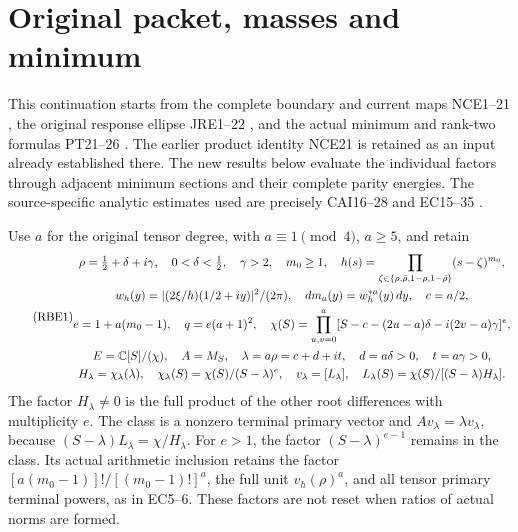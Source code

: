 \section{Original packet, masses and minimum}

This continuation starts from the complete boundary and current maps
NCE1--21 \cite{a04rbe:nce}, the original response ellipse JRE1--22
\cite{a04rbe:jre}, and the actual minimum and rank-two formulas PT21--26
\cite{a04rbe:pt}. The earlier product identity NCE21 is retained as an
input already established there. The new results below evaluate the
individual factors through adjacent minimum sections and their
complete parity energies. The source-specific analytic estimates used
are precisely CAI16--28 \cite{a04rbe:cai} and EC15--35 \cite{a04rbe:ec}.

Use \(a\) for the original tensor degree, with
\(a\equiv1\pmod4\), \(a\ge5\), and retain
\begin{equation}\tag{RBE1}
\begin{gathered}
 \rho=\tfrac12+\delta+i\gamma,\quad0<\delta<\tfrac12,\quad
 \gamma>2,\quad m_0\ge1,\quad
 h(s)=\prod_{\zeta\in\{\rho,\bar\rho,1-\rho,1-\bar\rho\}}
                       (s-\zeta)^{m_0},\\
 w_h(y)=|(2\xi/h)(1/2+iy)|^2/(2\pi),\quad
 dm_a(y)=w_h^{*a}(y)\,dy,\quad c=a/2,\\
 e=1+a(m_0-1),\quad q=e(a+1)^2,\quad
 \chi(S)=\prod_{u,v=0}^a
 [S-c-(2u-a)\delta-i(2v-a)\gamma]^e,\\
 E=\mathbb C[S]/(\chi),\quad A=M_S,\quad
 \lambda=a\rho=c+d+it,\quad d=a\delta>0,\quad t=a\gamma>0,\\
 H_\lambda=\chi_\lambda(\lambda),\quad
 \chi_\lambda(S)=\chi(S)/(S-\lambda)^e,\quad
 v_\lambda=[L_\lambda],\quad
 L_\lambda(S)=\chi(S)/[(S-\lambda)H_\lambda].
\end{gathered}
\end{equation}
The factor \(H_\lambda\ne0\) is the full product of the other
root differences with multiplicity \(e\). The class is a nonzero
terminal primary vector and \(Av_\lambda=\lambda v_\lambda\),
because \((S-\lambda)L_\lambda=\chi/H_\lambda\).
For \(e>1\), the factor \((S-\lambda)^{e-1}\) remains in
the class. Its actual arithmetic inclusion retains the factor
\([a(m_0-1)]!/[(m_0-1)!]^a\), the full unit \(v_h(\rho)^a\),
and all tensor primary terminal powers, as in EC5--6. These factors
are not reset when ratios of actual norms are formed.

